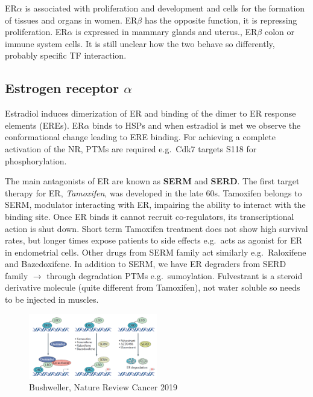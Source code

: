 ER$\alpha$ is associated with proliferation and development and cells for the formation of tissues and organs in women. ER$\beta$ has the opposite function, it is repressing proliferation. ER$\alpha$ is expressed in mammary glands and uterus., ER$\beta$ colon or immune system cells. It is still unclear how the two behave so differently, probably specific TF interaction.

\hypertarget{estrogen-receptor-alpha}{%
\subsection{\texorpdfstring{Estrogen receptor \(\alpha\)}{Estrogen receptor \textbackslash alpha}}\label{estrogen-receptor-alpha}}

Estradiol induces dimerization of ER and binding of the dimer to ER response elements (EREs). ER$\alpha$ binds to HSPs and when estradiol is met we observe the conformational change leading to ERE binding. For achieving a complete activation of the NR, PTMs are required e.g.~Cdk7 targets S118 for phosphorylation.

The main antagonists of ER are known as \textbf{SERM} and \textbf{SERD}. The first target therapy for ER, \emph{Tamoxifen}, was developed in the late 60s. Tamoxifen belongs to SERM, modulator interacting with ER, impairing the ability to interact with the binding site. Once ER binds it cannot recruit co-regulators, its transcriptional action is shut down. Short term Tamoxifen treatment does not show high survival rates, but longer times expose patients to side effects e.g.~acts as agonist for ER in endometrial cells. Other drugs from SERM family act similarly e.g.~Raloxifene and Bazedoxifene. In addition to SERM, we have ER degraders from SERD family $\rightarrow$ through degradation PTMs e.g.~sumoylation. Fulvestrant is a steroid derivative molecule (quite different from Tamoxifen), not water soluble so needs to be injected in muscles.

\begin{figure}
\centering
\includegraphics[width=0.5\textwidth]{../_resources/Screen_Shot_2022-11-18_at_11-06-54.png}
\caption{Bushweller, Nature Review Cancer 2019}
\end{figure}

